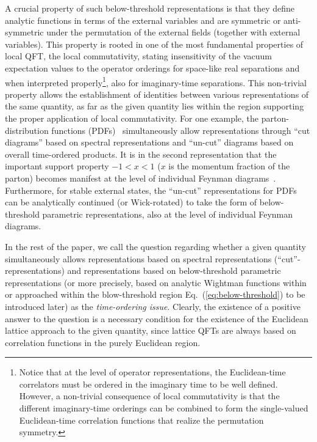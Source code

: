 \documentclass[a4paper,11pt]{article}
\begin{document}
A crucial property of such below-threshold representations is that they define analytic functions in terms of the external variables and are symmetric or anti-symmetric under the permutation of the external fields (together with external variables). This property is rooted in one of the most fundamental properties of local QFT, the local commutativity, stating insensitivity of the vacuum expectation values to the operator orderings for space-like real separations and when interpreted properly\footnote{Notice that at the level of operator representations, the Euclidean-time correlators must be ordered in the imaginary time to be well defined. However, a non-trivial consequence of local commutativity is that the different imaginary-time orderings can be combined to form the single-valued Euclidean-time correlation functions that realize the permutation symmetry. }, also for imaginary-time separations. This non-trivial property allows the establishment of identities between various representations of the same quantity, as far as the given quantity lies within the region supporting the proper application of local commutativity. For one example, the parton-distribution functions (PDFs)~\cite{Collins:2011zzd} simultaneously allow representations through ``cut diagrams'' based on spectral representations and ``un-cut'' diagrams based on overall time-ordered products. It is in the second representation that the important support property $-1<x<1$ ($x$ is the momentum fraction of the parton) becomes manifest at the level of individual Feynman diagrams~\cite{Collins:2011zzd}. Furthermore, for stable external states, the ``un-cut'' representations for PDFs can be analytically continued (or Wick-rotated) to take the form of below-threshold parametric representations, also at the level of individual Feynman diagrams. 


In the rest of the paper, we call the question regarding whether a given quantity simultaneously allows representations based on spectral representations (``cut''-representations) and representations based on below-threshold parametric representations (or more precisely, based on analytic Wightman functions within or approached within the blow-threshold region Eq.~(\ref{eq:below-threshold}) to be introduced later) as the {\it time-ordering issue}.  Clearly, the existence of a positive answer to the question is a necessary condition for the existence of the Euclidean lattice approach to the given quantity, since lattice QFTs are always based on correlation functions in the purely Euclidean region. 
\end{document}
